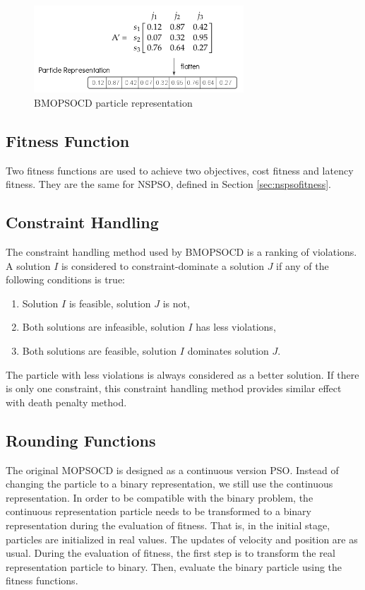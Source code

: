  \begin{figure}[H]
 \centering
   \includegraphics[width=0.7\textwidth]{pics/flatten.png}
   \caption{BMOPSOCD particle representation}
   \label{fig:flatten}
 \end{figure}

\subsection{Fitness Function}
Two fitness functions are used to achieve two objectives, cost fitness and latency fitness.
They are the same for NSPSO, defined in Section \ref{sec:nspsofitness}.



\subsection{Constraint Handling}

The constraint handling method used by BMOPSOCD is a ranking of violations. 
A solution $I$ is considered to constraint-dominate a solution $J$ if any of the following conditions is true:
\begin{enumerate}
 \item Solution $I$ is feasible, solution $J$ is not,
 \item Both solutions are infeasible, solution $I$ has less violations,
 \item Both solutions are feasible, solution $I$ dominates solution $J$.
\end{enumerate}

The particle with less violations is always considered as  a better solution. 
If there is only one constraint, this constraint handling method provides similar effect with death penalty method.


\subsection{Rounding Functions}

The original MOPSOCD is designed as a continuous version PSO. Instead of changing the particle to a binary representation, we still use the continuous representation. 
In order to be compatible with the binary problem, the continuous representation particle needs
to be transformed to a binary representation during the evaluation of fitness.
That is, in the initial stage, particles are initialized in real values. The updates of velocity and position are as usual. 
During the evaluation of fitness, the first step is to transform the real representation particle to binary. Then, evaluate the binary particle using
the fitness functions.


